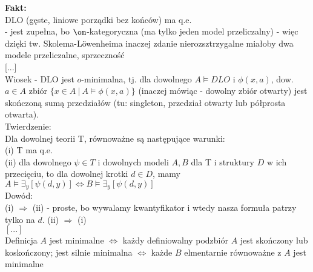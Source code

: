 \documentclass[12pt]{article}
\begin{document}
\textbf{Fakt:}\\
DLO (gęste, liniowe porządki bez końców) ma q.e.\\
- jest zupełna, bo $\om$-kategoryczna (ma tylko jeden model przeliczalny) - więc dzięki tw. Skolema-L{\"o}wenheima inaczej zdanie nierozsztrzygalne miałoby dwa modele przeliczalne, sprzeczność\\



[...]\\

Wiosek - DLO jest $o$-minimalna, tj. dla dowolnego $A\models DLO$ i $\phi(x,a)$, dow. $a\in A$ zbiór $\{x\in A\ |\ A\models \phi(x,a)\}$ (inaczej mówiąc - dowolny zbiór otwarty) jest skończoną sumą przedziałów (tu: singleton, przedział otwarty lub półprosta otwarta).
\\



Twierdzenie:\\
Dla dowolnej teorii T, równoważne są następujące warunki:\\
(i) T ma q.e.\\
(ii) dla dowolnego $\psi\in T$ i dowolnych modeli $A,B$ dla T i struktury $D$ w ich przecięciu, to dla dowolnej krotki $d\in D$, mamy $A\models\exists_{y}[\psi(d, y)]\iff B\models\exists_{y}[\psi(d, y)]$\\

Dowód:\\
(i) $\Rightarrow$ (ii) - proste, bo wywalamy kwantyfikator i wtedy nasza formuła patrzy tylko na $d$.
(ii) $\Rightarrow$ (i)\\
$[...]$\\



Definicja $A$ jest minimalne $\iff$ każdy definiowalny podzbiór $A$ jest skończony lub koskończony; jest silnie minimalna $\iff$ każde $B$ elmentarnie równoważne z $A$ jest minimalne
\end{document}
